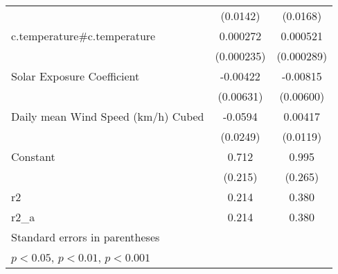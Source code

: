 {\begin{tabular}{l*{2}{c}}
                    &    (0.0142)         &    (0.0168)         \\
[1em]
c.temperature#c.temperature&    0.000272         &    0.000521         \\
                    &  (0.000235)         &  (0.000289)         \\
[1em]
Solar Exposure Coefficient&    -0.00422         &    -0.00815         \\
                    &   (0.00631)         &   (0.00600)         \\
[1em]
Daily mean Wind Speed (km/h) Cubed&     -0.0594         &     0.00417         \\
                    &    (0.0249)         &    (0.0119)         \\
[1em]
Constant            &       0.712\sym{*}  &       0.995\sym{*}  \\
                    &     (0.215)         &     (0.265)         \\
\hline
r2                  &       0.214         &       0.380         \\
r2\_a                &       0.214         &       0.380         \\
\hline\hline
\multicolumn{3}{l}{\footnotesize Standard errors in parentheses}\\
\multicolumn{3}{l}{\footnotesize \sym{*} \(p<0.05\), \sym{**} \(p<0.01\), \sym{***} \(p<0.001\)}\\
\end{tabular}
}
